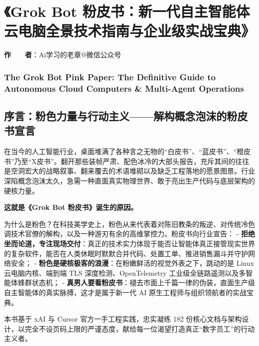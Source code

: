 \documentclass[10.5pt,a4paper,oneside]{report}
\begin{document}
\tableofcontents
\newpage
{}


\chapter{《Grok Bot
粉皮书：新一代自主智能体云电脑全景技术指南与企业级实战宝典》}\label{grok-bot-ux7c89ux76aeux4e66ux65b0ux4e00ux4ee3ux81eaux4e3bux667aux80fdux4f53ux4e91ux7535ux8111ux5168ux666fux6280ux672fux6307ux5357ux4e0eux4f01ux4e1aux7ea7ux5b9eux6218ux5b9dux5178}

\textbf{作　　者}：Ai学习的老章@微信公众号

\subsection{The Grok Bot Pink Paper: The Definitive Guide to Autonomous
Cloud Computers \& Multi-Agent
Operations}\label{the-grok-bot-pink-paper-the-definitive-guide-to-autonomous-cloud-computers-multi-agent-operations}

\section{序言：粉色力量与行动主义------解构概念泡沫的粉皮书宣言}\label{ux5e8fux8a00ux7c89ux8272ux529bux91cfux4e0eux884cux52a8ux4e3bux4e49ux89e3ux6784ux6982ux5ff5ux6ce1ux6cabux7684ux7c89ux76aeux4e66ux5ba3ux8a00}

在当今的人工智能行业，桌面堆满了各种言之无物的``白皮书''、``蓝皮书''、``橙皮书''乃至``X皮书''。翻开那些装帧严肃、配色冰冷的大部头报告，充斥其间的往往是空洞宏大的战略叙事、翻来覆去的术语堆砌以及缺乏工程落地的愿景图景。行业深陷概念泡沫太久，急需一种直面真实物理世界、敢于亮出生产代码与底层架构的硬核力量。

\textbf{这就是《Grok Bot 粉皮书》诞生的原因。}

为什么是粉色？在科技美学史上，粉色从来代表着对陈旧教条的叛逆、对传统冷色调技术官僚的解构，以及一种游刃有余的高维掌控力。粉皮书向行业宣告：
-
\textbf{拒绝坐而论道，专注现场交付}：真正的技术实力体现于能否让智能体真正接管现实世界的复杂软件，能否在人类休眠时默默合并代码、处置工单、推进销售漏斗并守护网络安全；
- \textbf{粉色是硬核极客的浪漫}：在粉嫩鲜活的视觉外表之下，跳动的是
Linux 云电脑内核、端到端 TLS 深度检测、OpenTelemetry
工业级全链路遥测以及多智能体蜂群状态机； -
\textbf{真男人要看粉皮书}：褪去市面上千篇一律的伪装，直面生产级自主智能体的真实脉搏，这才是属于新一代
AI 原生工程师与组织领航者的实战宝典。

本书基于 xAI 与 Cursor 官方一手工程实践，忠实凝练 182
份核心文档与架构设计，以完全不设页码上限的严谨态度，献给每一位渴望打造真正``数字员工''的行动主义者。
\end{document}
